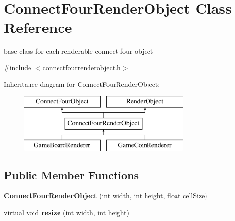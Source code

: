 \hypertarget{classConnectFourRenderObject}{\section{\-Connect\-Four\-Render\-Object \-Class \-Reference}
\label{classConnectFourRenderObject}
}


base class for each renderable connect four object  




{\ttfamily \#include $<$connectfourrenderobject.\-h$>$}

\-Inheritance diagram for \-Connect\-Four\-Render\-Object\-:\begin{figure}[H]
\begin{center}
\leavevmode
\includegraphics[height=3.000000cm]{classConnectFourRenderObject}
\end{center}
\end{figure}
\subsection*{\-Public \-Member \-Functions}
\begin{DoxyCompactItemize}
\item 
\hypertarget{classConnectFourRenderObject_ab89a0ead57bcac10a73a2e01969e86c6}{{\bfseries \-Connect\-Four\-Render\-Object} (int width, int height, float cell\-Size)}\label{classConnectFourRenderObject_ab89a0ead57bcac10a73a2e01969e86c6}

\item 
\hypertarget{classConnectFourRenderObject_a9b29bbc57d9985db1075a1b147b15801}{virtual void {\bfseries resize} (int width, int height)}\label{classConnectFourRenderObject_a9b29bbc57d9985db1075a1b147b15801}

\end{DoxyCompactItemize}
